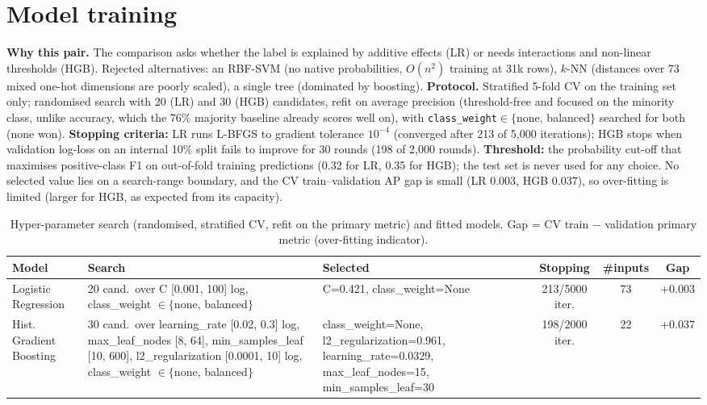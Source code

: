 \documentclass[10pt]{article}
\begin{document}
\section{Model training}
\textbf{Why this pair.} The comparison asks whether the label is explained by additive effects (LR) or needs interactions and non-linear thresholds (HGB). Rejected alternatives: an RBF-SVM (no native probabilities, $O(n^2)$ training at 31k rows), $k$-NN (distances over 73 mixed one-hot dimensions are poorly scaled), a single tree (dominated by boosting).
\textbf{Protocol.} Stratified 5-fold CV on the training set only; randomised search with 20 (LR) and 30 (HGB) candidates, refit on average precision (threshold-free and focused on the minority class, unlike accuracy, which the 76\% majority baseline already scores well on), with \texttt{class\_weight}$\in\{$none, balanced$\}$ searched for both (none won). \textbf{Stopping criteria:} LR runs L-BFGS to gradient tolerance $10^{-4}$ (converged after 213 of 5{,}000 iterations); HGB stops when validation log-loss on an internal 10\% split fails to improve for 30 rounds (198 of 2{,}000 rounds). \textbf{Threshold:} the probability cut-off that maximises positive-class F1 on out-of-fold training predictions (0.32 for LR, 0.35 for HGB); the test set is never used for any choice. No selected value lies on a search-range boundary, and the CV train--validation AP gap is small (LR 0.003, HGB 0.037), so over-fitting is limited (larger for HGB, as expected from its capacity).
\begin{table}[!htb]\centering\footnotesize\setlength{\tabcolsep}{3pt}
\caption{Hyper-parameter search (randomised, stratified CV, refit on the primary metric) and fitted models. Gap = CV train $-$ validation primary metric (over-fitting indicator).}\label{tab:config}
\begin{tabularx}{\linewidth}{l Y Y c c c}\toprule
Model & Search & Selected & Stopping & \#inputs & Gap\\\midrule
Logistic Regression & 20 cand.\ over C [0.001, 100] log, class\_weight $\in\{$none, balanced$\}$ & C=0.421, class\_weight=None & 213/5000 iter. & 73 & +0.003\\
Hist. Gradient Boosting & 30 cand.\ over learning\_rate [0.02, 0.3] log, max\_leaf\_nodes [8, 64], min\_samples\_leaf [10, 600], l2\_regularization [0.0001, 10] log, class\_weight $\in\{$none, balanced$\}$ & class\_weight=None, l2\_regularization=0.961, learning\_rate=0.0329, max\_leaf\_nodes=15, min\_samples\_leaf=30 & 198/2000 iter. & 22 & +0.037\\
\bottomrule\end{tabularx}\end{table}
\end{document}
